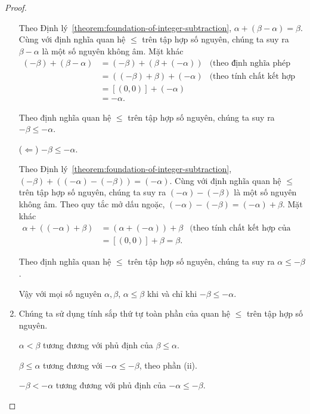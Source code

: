 \begin{proof}
\begin{enumerate}[label={(\roman*)}]
		      Theo Định lý~\ref{theorem:foundation-of-integer-subtraction}, $\alpha + (\beta - \alpha) = \beta$. Cùng với định nghĩa quan hệ $\leq$ trên tập hợp số nguyên, chúng ta suy ra $\beta - \alpha$ là một số nguyên không âm. Mặt khác
		      \begin{align*}
			      (-\beta) + (\beta - \alpha) & = (-\beta) + (\beta + (-\alpha)) & \text{(theo định nghĩa phép trừ hai số nguyên)}         \\
			                                  & = ((-\beta) + \beta) + (-\alpha) & \text{(theo tính chất kết hợp của phép cộng số nguyên)} \\
			                                  & = [(0,0)] + (-\alpha)                                                                      \\
			                                  & = -\alpha.
		      \end{align*}

		      Theo định nghĩa quan hệ $\leq$ trên tập hợp số nguyên, chúng ta suy ra $-\beta\leq -\alpha$.

		      ($\Leftarrow$) $-\beta\leq -\alpha$.

		      Theo Định lý~\ref{theorem:foundation-of-integer-subtraction}, $(-\beta) + ((-\alpha) - (-\beta)) = (-\alpha)$. Cùng với định nghĩa quan hệ $\leq$ trên tập hợp số nguyên, chúng ta suy ra $(-\alpha) -(-\beta)$ là một số nguyên không âm. Theo quy tắc mở dấu ngoặc, $(-\alpha) - (-\beta) = (-\alpha) + \beta$. Mặt khác
		      \begin{align*}
			      \alpha + ((-\alpha) + \beta) & = (\alpha + (-\alpha)) + \beta & \text{(theo tính chất kết hợp của phép cộng hai số nguyên)} \\
			                                   & = [(0,0)] + \beta = \beta.
		      \end{align*}

		      Theo định nghĩa quan hệ $\leq$ trên tập hợp số nguyên, chúng ta suy ra $\alpha\leq -\beta$.

		      Vậy với mọi số nguyên $\alpha, \beta$, $\alpha\leq \beta$ khi và chỉ khi $-\beta\leq-\alpha$.
		\item Chúng ta sử dụng tính sắp thứ tự toàn phần của quan hệ $\leq$ trên tập hợp số nguyên.

		      $\alpha < \beta$ tương đương với phủ định của $\beta\leq\alpha$.

		      $\beta\leq\alpha$ tương đương với $-\alpha\leq-\beta$, theo phần (ii).

		      $-\beta < -\alpha$ tương đương với phủ định của $-\alpha\leq-\beta$.


\end{enumerate}
\end{proof}
